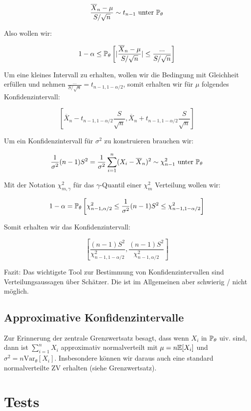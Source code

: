 $$\frac{\overline{X}_n - \mu}{S / \sqrt{n}} \sim t_{n-1} \text{ unter } \mathbb{P}_\theta$$

Also wollen wir:

$$1- \alpha \leq \mathbb{P}_\theta \left[ | \frac{\overline{X}_n - \mu}{S / \sqrt{n}} | \leq \frac{...}{ S / \sqrt{n}} \right]$$

Um eine kleines Intervall zu erhalten, wollen wir die Bedingung mit Gleichheit erfüllen und nehmen $\frac{...}{ S / \sqrt{n}} = t_{n-1, 1 - \alpha / 2}$, somit erhalten wir für $\mu$ folgendes Konfidenzintervall:

$$\left[ \overline{X}_n - t_{n-1, 1 - \alpha / 2} \frac{S}{\sqrt{n}},  \overline{X}_n + t_{n-1, 1 - \alpha / 2} \frac{S}{\sqrt{n}} \right]$$

Um ein Konfidenzintervall für $\sigma^2$ zu konstruieren brauchen wir:

$$\frac{1}{\sigma^2} (n-1) S^2 = \frac{1}{\sigma^2} \sum\limits_{i=1}^n (X_i - \overline{X}_n)^2 \sim \chi_{n-1}^2 \text{ unter } \mathbb{P}_\theta$$

Mit der Notation $\chi_{m, \gamma}^2$ für das $\gamma$-Quantil einer $\chi_m^2$ Verteilung wollen wir:

$$1 - \alpha = \mathbb{P}_\theta \left[ \chi_{n-1, \alpha/2}^2 \leq \frac{1}{\sigma^2} (n-1) S^2 \leq \chi_{n-1, 1- \alpha/2}^2\right]$$

Somit erhalten wir das Konfidenzintervall:

$$\left[ \frac{(n-1) S^2}{\chi_{n-1, 1-\alpha/2}^2} , \frac{(n-1) S^2}{\chi_{n-1, \alpha/2}^2} \right]$$

Fazit: Das wichtigste Tool zur Bestimmung von Konfidenzintervallen sind Verteilungsaussagen über Schätzer. Die ist im Allgemeinen aber schwierig / nicht möglich.


\subsection{Approximative Konfidenzintervalle}

Zur Erinnerung der zentrale Grenzwertsatz besagt, dass wenn $X_i$ in $\mathbb{P}_\theta$ uiv. sind, dann ist $\sum_{i=1}^n X_i$ approximativ normalverteilt mit $\mu = n \mathbb{E}[X_i]$ und $\sigma^2 = n \text{Var}_\theta[X_i]$. Insbesondere können wir daraus auch eine standard normalverteilte ZV erhalten (siehe Grenzwertsatz).


\section{Tests}


